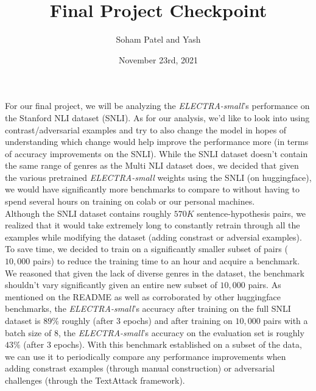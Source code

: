 \documentclass{article}
\title{Final Project Checkpoint}
\author{Soham Patel and Yash}
\date{November 23rd, 2021}
\begin{document}
\maketitle

For our final project, we will be analyzing the \textit{ELECTRA-small}'s performance on the Stanford NLI dataset (SNLI). As for our analysis, we'd like to look into using contrast/adversarial examples and try to also change the model in hopes of understanding which change would help improve the performance more (in terms of accuracy improvements on the SNLI). While the SNLI dataset doesn't contain the same range of genres as the Multi NLI dataset does, we decided that given the various pretrained \textit{ELECTRA-small} weights using the SNLI (on huggingface), we would have significantly more benchmarks to compare to without having to spend several hours on training on colab or our personal machines. \\

Although the SNLI dataset contains roughly $570K$ sentence-hypothesis pairs, we realized that it would take extremely long to constantly retrain through all the examples while modifying the dataset (adding constrast or adversial examples). To save time, we decided to train on a significantly smaller subset of pairs ($10,000$ pairs) to reduce the training time to an hour and acquire a benchmark. We reasoned that given the lack of diverse genres in the dataset, the benchmark shouldn't vary significantly given an entire new subset of $10,000$ pairs. As mentioned on the README as well as corroborated by other huggingface benchmarks, the \textit{ELECTRA-small}'s accuracy after training on the full SNLI dataset is $89\%$ roughly (after 3 epochs) and after training on $10,000$ pairs with a batch size of $8$, the \textit{ELECTRA-small}'s accuracy on the evaluation set is roughly $43\%$ (after 3 epochs). With this benchmark established on a subset of the data, we can use it to periodically compare any performance improvements when adding constrast examples (through manual construction) or adversarial challenges (through the TextAttack framework). \\
\end{document}
